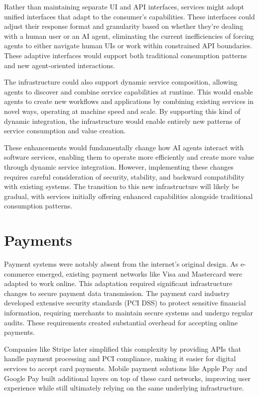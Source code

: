 \documentclass{article}
\begin{document}
Rather than maintaining separate UI and API interfaces, services might adopt unified interfaces that adapt to the consumer's capabilities. These interfaces could adjust their response format and granularity based on whether they're dealing with a human user or an AI agent, eliminating the current inefficiencies of forcing agents to either navigate human UIs or work within constrained API boundaries. These adaptive interfaces would support both traditional consumption patterns and new agent-oriented interactions.

The infrastructure could also support dynamic service composition, allowing agents to discover and combine service capabilities at runtime. This would enable agents to create new workflows and applications by combining existing services in novel ways, operating at machine speed and scale. By supporting this kind of dynamic integration, the infrastructure would enable entirely new patterns of service consumption and value creation.

These enhancements would fundamentally change how AI agents interact with software services, enabling them to operate more efficiently and create more value through dynamic service integration. However, implementing these changes requires careful consideration of security, stability, and backward compatibility with existing systems. The transition to this new infrastructure will likely be gradual, with services initially offering enhanced capabilities alongside traditional consumption patterns.


\section{Payments}
\label{sec:payments}




Payment systems were notably absent from the internet's original design. As e-commerce emerged, existing payment networks like Visa and Mastercard were adapted to work online. This adaptation required significant infrastructure changes to secure payment data transmission. The payment card industry developed extensive security standards (PCI DSS) to protect sensitive financial information, requiring merchants to maintain secure systems and undergo regular audits. These requirements created substantial overhead for accepting online payments.

Companies like Stripe later simplified this complexity by providing APIs that handle payment processing and PCI compliance, making it easier for digital services to accept card payments. Mobile payment solutions like Apple Pay and Google Pay built additional layers on top of these card networks, improving user experience while still ultimately relying on the same underlying infrastructure.
\end{document}

